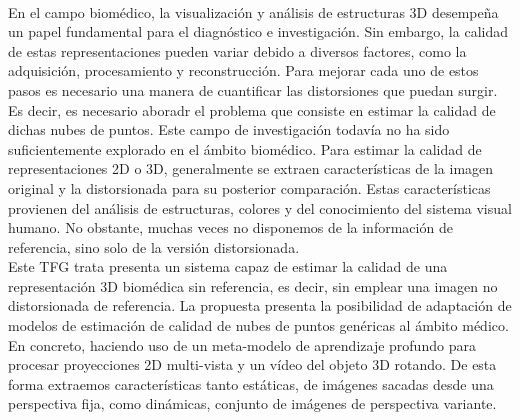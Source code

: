 \chapter*{}


% 


\thispagestyle{empty}

\begin{center}
{\large\bfseries \myTitle}\\
\end{center}
\begin{center}
\myName\\
\end{center}

\\

\\
En el campo biomédico, la visualización y análisis de estructuras 3D
desempeña un papel fundamental para el diagnóstico e investigación. 
Sin embargo, la calidad de estas representaciones pueden variar debido a diversos factores, como la adquisición, procesamiento y reconstrucción. 
Para mejorar cada uno de estos pasos es necesario una manera de cuantificar las distorsiones que puedan surgir. 
Es decir, es necesario aboradr el problema que consiste en estimar la calidad 
de dichas nubes de puntos. Este campo de investigación todavía no ha sido 
suficientemente explorado en el ámbito biomédico.
Para estimar la calidad de representaciones 2D o 3D, generalmente se extraen características de la imagen original y la distorsionada para su posterior 
comparación. Estas características provienen del análisis de estructuras, colores y 
del conocimiento del sistema visual humano. No obstante, 
muchas veces no disponemos de la información de referencia, sino solo de la versión distorsionada.
\\

Este TFG trata presenta un sistema capaz de estimar la calidad de 
una representación 3D biomédica sin referencia, es decir, sin emplear una imagen 
no distorsionada de referencia. La propuesta presenta la posibilidad de 
adaptación de modelos de estimación de calidad de nubes de puntos genéricas 
al ámbito médico. En concreto, haciendo uso de un meta-modelo de aprendizaje profundo para 
procesar proyecciones 2D multi-vista y un vídeo del objeto 3D rotando. 
De esta forma extraemos características tanto estáticas, de imágenes 
sacadas desde una perspectiva fija, como dinámicas, conjunto de imágenes de 
perspectiva variante.
\\

